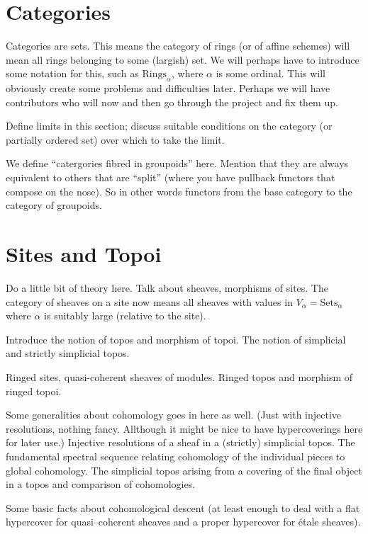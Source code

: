 \section{Categories}
\label{section-categories}

\noindent
Categories are sets. This means the category of rings (or of affine 
schemes) will mean all rings belonging to some (largish) set. We will 
perhaps have to introduce some notation for this, such as 
$\text{Rings}_\alpha$, where $\alpha$ is some ordinal. This will 
obviously create some problems and difficulties later. Perhaps we
will have contributors who will now and then go through the project and 
fix them up.

\medskip\noindent
Define limits in this section; discuss suitable conditions on the
category (or partially ordered set) over which to take the limit.

\medskip\noindent
We define ``catergories fibred in groupoids'' here. Mention that they are
always equivalent to others that are ``split'' (where you have pullback 
functors that compose on the nose). So in other words functors from the base
category to the category of groupoids.

\section{Sites and Topoi}
\label{section-sites}

\noindent
Do a little bit of theory here. Talk about sheaves, morphisms of sites.
The category of sheaves on a site now means all sheaves with values in
$V_\alpha = \text{Sets}_\alpha$ where $\alpha$ is suitably large (relative
to the site).

Introduce the notion of topos and morphism of topoi. The notion of 
simplicial and strictly simplicial topos.

\medskip\noindent
Ringed sites, quasi-coherent sheaves of modules. Ringed topos and 
morphism of ringed topoi.

\medskip\noindent
Some generalities about cohomology goes in here as well. (Just with
injective resolutions, nothing fancy. Allthough it might be nice to
have hypercoverings here for later use.) Injective resolutions of a
sheaf in a (strictly) simplicial topos.  The fundamental spectral 
sequence relating cohomology of the individual pieces to global
cohomology. The simplicial topos arising from a covering of the final
object in a topos and comparison of cohomologies.

\medskip\noindent
Some basic facts about cohomological descent (at least enough to deal
with a flat hypercover for quasi--coherent sheaves and a proper
hypercover for \'etale sheaves).

